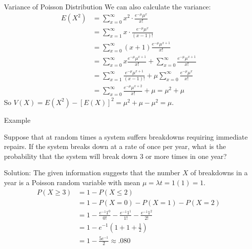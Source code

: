 \documentclass[]{beamer}
\begin{document}
    \begin{frame}{Variance of Poisson Distribution}
    We can also calculate the variance:
    {\small
    \begin{align*}
    E(X^2) &= \sum_{x=0}^\infty x^2\cdot\frac{e^{-\mu}\mu^x}{x!}\\
    &= \sum_{x=1}^\infty x\cdot\frac{e^{-\mu}\mu^x}{(x-1)!}\\
    &= \sum_{x=0}^\infty (x+1)\frac{e^{-\mu}\mu^{x+1}}{x!}\\
    &= \sum_{x=0}^\infty x\frac{e^{-\mu}\mu^{x+1}}{x!} + \sum_{x=0}^\infty \frac{e^{-\mu}\mu^{x+1}}{x!}\\
    &= \sum_{x=1}^\infty \frac{e^{-\mu}\mu^{x+1}}{(x-1)!} + \mu\sum_{x=0}^\infty \frac{e^{-\mu}\mu^{x}}{x!}\\
    &= \sum_{x=0}^\infty \frac{e^{-\mu}\mu^{x+2}}{x!}+\mu
    = \mu^2+\mu
    \end{align*}}
    So $V(X)=E(X^2)-[E(X)]^2=\mu^2+\mu-\mu^2 = \mu$.
    \end{frame}

    \begin{frame}{Example}
        \begin{block}{}
        Suppose that at random times a system suffers breakdowns requiring immediate repairs. If the system breaks down at a rate of once per year, what is the probability that the system will break down 3 or more times in one year?
        \end{block}
        \pause Solution: The given information suggests that the number $X$ of breakdowns in a year is a Poisson random variable with mean $\mu=\lambda t = 1(1)=1$. 
        \pause \begin{align*}
        P(X \geq 3) &= 1 - P(X \leq 2) \\
        &= 1 - P(X=0) - P(X=1)-P(X=2) \\
        &= 1 - \frac{e^{-1}1^0}{0!} - \frac{e^{-1}1^1}{1!} - \frac{e^{-1}1^2}{2!} \\
        &= 1 - e^{-1}\left(1+1+\frac12\right) \\
        &= 1 - \frac{5e^{-1}}2 \approx .080
        \end{align*}
        \end{frame}
\end{document}
